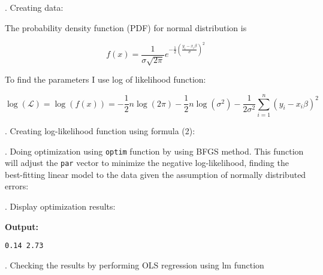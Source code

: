 \documentclass[12pt,letterpaper]{article}
\begin{document}
\vspace{.5cm}
. Creating data:
 

\vspace{.5cm}
\noindent The probability density function (PDF) for normal distribution is

\begin{equation} 
f(x)= \frac{1}{\sigma\sqrt {2\pi}} e^{-\frac{1}{2} (\frac{y_i-x_i\beta}{\sigma})^2}
\end{equation}

\vspace{.5cm}
\noindent To find the parameters I use log of likelihood function:

\begin{equation} 
	\log(\mathcal{L}) = \log(f(x))= -\frac{1}{2} n \log(2\pi) - \frac{1}{2} n \log(\sigma^2) - \frac{1}{2\sigma^2} \sum_{i=1}^{n} (y_i - x_i\beta)^2 
\end{equation}

\vspace{.5cm}
. Creating log-likelihood function using formula (2):
 

\vspace{.5cm}
. Doing optimization using \texttt{optim} function by using BFGS method. This function will adjust the \texttt{par} vector to minimize the negative log-likelihood, finding the best-fitting linear model to the data given the assumption of normally distributed errors:
 

\vspace{.5cm}
. Display optimization results:
 

\vspace{.5cm}
\noindent \textbf{Output: }
\begin{lstlisting}
0.14 2.73
 \end{lstlisting}

\vspace{.5cm}
. Checking the results by performing OLS regression using lm function
 
\end{document}
